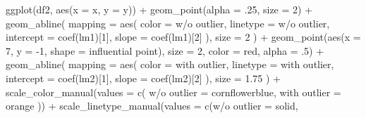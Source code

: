 \documentclass[
  letterpaper,
  DIV=11,
  numbers=noendperiod]{scrreport}
\newenvironment{Shaded}{\begin{snugshade}}{\end{snugshade}}
\newcommand{\AttributeTok}[1]{\textcolor[rgb]{0.40,0.45,0.13}{#1}}
\newcommand{\DecValTok}[1]{\textcolor[rgb]{0.68,0.00,0.00}{#1}}
\newcommand{\FloatTok}[1]{\textcolor[rgb]{0.68,0.00,0.00}{#1}}
\newcommand{\FunctionTok}[1]{\textcolor[rgb]{0.28,0.35,0.67}{#1}}
\newcommand{\NormalTok}[1]{\textcolor[rgb]{0.00,0.23,0.31}{#1}}
\newcommand{\OtherTok}[1]{\textcolor[rgb]{0.00,0.23,0.31}{#1}}
\newcommand{\SpecialCharTok}[1]{\textcolor[rgb]{0.37,0.37,0.37}{#1}}
\newcommand{\StringTok}[1]{\textcolor[rgb]{0.13,0.47,0.30}{#1}}
\begin{document}
\begin{Shaded}
\begin{Highlighting}[]
\FunctionTok{ggplot}\NormalTok{(df2, }\FunctionTok{aes}\NormalTok{(}\AttributeTok{x =}\NormalTok{ x, }\AttributeTok{y =}\NormalTok{ y)) }\SpecialCharTok{+} 
  \FunctionTok{geom\_point}\NormalTok{(}\AttributeTok{alpha =}\NormalTok{ .}\DecValTok{25}\NormalTok{, }\AttributeTok{size =} \DecValTok{2}\NormalTok{) }\SpecialCharTok{+} 
  \FunctionTok{geom\_abline}\NormalTok{(}
    \AttributeTok{mapping =} \FunctionTok{aes}\NormalTok{(}
      \AttributeTok{color =} \StringTok{\textquotesingle{}w/o outlier\textquotesingle{}}\NormalTok{,}
      \AttributeTok{linetype =} \StringTok{\textquotesingle{}w/o outlier\textquotesingle{}}\NormalTok{,}
      \AttributeTok{intercept =} \FunctionTok{coef}\NormalTok{(lm1)[}\DecValTok{1}\NormalTok{],}
      \AttributeTok{slope =} \FunctionTok{coef}\NormalTok{(lm1)[}\DecValTok{2}\NormalTok{]}
\NormalTok{    ),}
    \AttributeTok{size =} \DecValTok{2}
\NormalTok{  ) }\SpecialCharTok{+}
  \FunctionTok{geom\_point}\NormalTok{(}\FunctionTok{aes}\NormalTok{(}\AttributeTok{x =} \DecValTok{7}\NormalTok{, }\AttributeTok{y =} \SpecialCharTok{{-}}\DecValTok{1}\NormalTok{, }\AttributeTok{shape =} \StringTok{\textquotesingle{}influential point\textquotesingle{}}\NormalTok{), }\AttributeTok{size =} \DecValTok{2}\NormalTok{, }\AttributeTok{color =} \StringTok{\textquotesingle{}red\textquotesingle{}}\NormalTok{, }\AttributeTok{alpha =}\NormalTok{ .}\DecValTok{5}\NormalTok{) }\SpecialCharTok{+} 
  \FunctionTok{geom\_abline}\NormalTok{(}
    \AttributeTok{mapping =} \FunctionTok{aes}\NormalTok{(}
      \AttributeTok{color =} \StringTok{\textquotesingle{}with outlier\textquotesingle{}}\NormalTok{,}
      \AttributeTok{linetype =} \StringTok{\textquotesingle{}with outlier\textquotesingle{}}\NormalTok{,}
      \AttributeTok{intercept =} \FunctionTok{coef}\NormalTok{(lm2)[}\DecValTok{1}\NormalTok{],}
      \AttributeTok{slope =} \FunctionTok{coef}\NormalTok{(lm2)[}\DecValTok{2}\NormalTok{]}
\NormalTok{    ),}
    \AttributeTok{size =} \FloatTok{1.75}
\NormalTok{  ) }\SpecialCharTok{+}
  \FunctionTok{scale\_color\_manual}\NormalTok{(}\AttributeTok{values =} \FunctionTok{c}\NormalTok{(}
    \StringTok{\textquotesingle{}w/o outlier\textquotesingle{}} \OtherTok{=} \StringTok{\textquotesingle{}cornflowerblue\textquotesingle{}}\NormalTok{,}
    \StringTok{\textquotesingle{}with outlier\textquotesingle{}} \OtherTok{=} \StringTok{\textquotesingle{}orange\textquotesingle{}}
\NormalTok{  )) }\SpecialCharTok{+}
  \FunctionTok{scale\_linetype\_manual}\NormalTok{(}\AttributeTok{values =} \FunctionTok{c}\NormalTok{(}\StringTok{\textquotesingle{}w/o outlier\textquotesingle{}} \OtherTok{=} \StringTok{\textquotesingle{}solid\textquotesingle{}}\NormalTok{,}

\end{Highlighting}
\end{Shaded}
\end{document}
